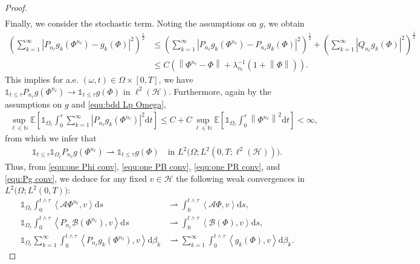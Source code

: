 \documentclass[11pt, reqno]{amsart}
\theoremstyle{definition}
\numberwithin{equation}{section}
\newcommand{\bb}{\mathbb}
\newcommand{\dt}{\mathrm{d}t}
\newcommand{\ds}{\mathrm{d}s}
\newcommand{\norm}[1]{\left\|{#1}\right\|}
\newcommand{\inpro}[2]{\left\langle#1,#2\right\rangle}
\newcommand{\abs}[1]{\left|{#1}\right|}
\newcommand{\one}{\mathds{1}}
\begin{document}
\begin{proof}
\begin{align}
\end{align}
Finally, we consider the stochastic term. Noting the assumptions on $g$, we obtain
\begin{align*}
	\left(\sum_{k=1}^\infty \abs{P_{n_\ell} g_k(\Phi^{n_\ell})- g_k(\Phi)}^2 \right)^{\frac12}
	&\leq
	\left(\sum_{k=1}^\infty \abs{P_{n_\ell} g_k(\Phi^{n_\ell})- P_{n_\ell} g_k(\Phi)}^2 \right)^{\frac12} + \left(\sum_{k=1}^\infty \abs{Q_{n_\ell} g_k(\Phi)}^2 \right)^{\frac12}
	\\
	&\leq
	C\left( \norm{\Phi^{n_\ell}- \Phi} + \lambda_{n_\ell}^{-1} (1+\norm{\Phi})\right).
\end{align*}
This implies for a.e. $(\omega,t)\in \Omega\times [0,T]$, we have $\one_{t\leq \tau} P_{n_\ell} g(\Phi^{n_\ell}) \to \one_{t\leq \tau} g(\Phi)$ in $\ell^2(\mathcal{H})$. Furthermore, again by the assumptions on $g$ and \eqref{equ:bdd Lp Omega},
\begin{align*}
	\sup_{\ell\in \bb{N}} \bb{E}\left[\one_{\Omega_\ell} \int_0^\tau \sum_{k=1}^\infty \abs{P_{n_\ell} g_k(\Phi^{n_\ell})}^2 \dt \right]
	\leq
	C + C \sup_{\ell\in \bb{N}} \bb{E}\left[\one_{\Omega_\ell} \int_0^\tau \norm{\Phi^{n_\ell}}^2 \dt\right] < \infty,
\end{align*}
from which we infer that
\begin{align}\label{equ:Pg conv}
	\one_{t\leq \tau} \one_{\Omega_\ell} P_{n_\ell} g(\Phi^{n_\ell}) \rightharpoonup \one_{t\leq \tau} g(\Phi) \quad \text{in } L^2\big(\Omega; L^2(0,T; \ell^2(\mathcal{H})) \big).
\end{align}
Thus, from \eqref{equ:one Phi conv}, \eqref{equ:one PB conv}, \eqref{equ:one PR conv}, and \eqref{equ:Pg conv}, we deduce for any fixed $v\in \mathcal{H}$ the following weak convergences in $L^2\big(\Omega; L^2(0,T)\big)$:
\begin{equation}\label{equ:weak conv L2}
	\begin{aligned}
		\one_{\Omega_\ell} \int_0^{t\wedge \tau} \inpro{\mathcal{A}\Phi^{n_\ell}}{v} \ds &\rightharpoonup \int_0^{t\wedge\tau} \inpro{\mathcal{A} \Phi}{v} \ds,
		\\
		\one_{\Omega_\ell} \int_0^{t\wedge\tau} \inpro{P_{n_\ell} \mathcal{B}(\Phi^{n_\ell})}{v} \ds &\rightharpoonup \int_0^{t\wedge\tau} \inpro{\mathcal{B}(\Phi)}{v} \ds,
		\\
		\one_{\Omega_\ell} \sum_{k=1}^\infty \int_0^{t\wedge\tau} \inpro{P_{n_\ell} g_k(\Phi^{n_\ell})}{v} \mathrm{d}\beta_k &\rightharpoonup \sum_{k=1}^\infty \int_0^{t\wedge\tau} \inpro{g_k(\Phi)}{v} \mathrm{d}\beta_k.
	\end{aligned}
\end{equation}


\end{proof}
\end{document}
